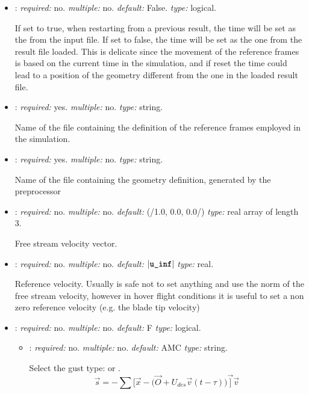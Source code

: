 \begin{itemize}
\item {}: \textit{required:} no. \textit{multiple:} no. \textit{default:} False. \textit{type:} logical.

If set to true, when restarting from a previous result, the time will be set as the  from the input file. If set to false, the time will be set as the one from the result file loaded. This is delicate since the movement of the reference frames is based on the current time in the simulation, and if reset the time could lead to a position of the geometry different from the one in the loaded result file.


\item {}: \textit{required:} yes. \textit{multiple:} no. \textit{type:} string.

Name of the file containing the definition of the reference frames employed in the simulation.


\item {}: \textit{required:} yes. \textit{multiple:} no. \textit{type:} string.

Name of the file containing the geometry definition, generated by the preprocessor


\item {}: \textit{required:} no. \textit{multiple:} no. \textit{default:} (/1.0, 0.0, 0.0/) \textit{type:} real array of length 3.

Free stream velocity vector.

\item {}: \textit{required:} no. \textit{multiple:} no. \textit{default:} $|\text{\textbf{\texttt{u\_inf}}}|$ \textit{type:} real.

Reference velocity. Usually is safe not to set anything and use the norm of the free stream velocity, however in hover flight conditions it is useful to set a non zero reference velocity (e.g. the blade tip velocity)


\item {}: \textit{required:} no. \textit{multiple:} no. \textit{default:} F \textit{type:} logical.

\begin{itemize}
    
    \item {}: \textit{required:} no. \textit{multiple:} no. \textit{default:} AMC \textit{type:} string.
    
    Select the gust type:  or .
    \begin{equation}
        \vec{s} = -\sum \big[\vec{x} - \big(\vec{O} + U_{des}\vec{v}(t-\tau)\big)\vec]\vec{v}
    \end{equation}
        

\end{itemize}
\end{itemize}
